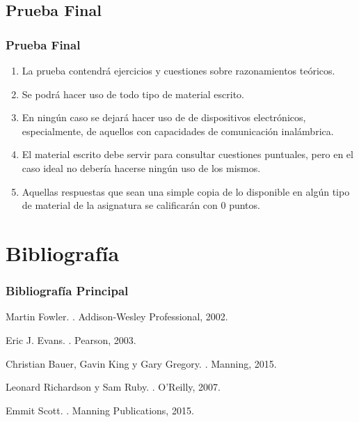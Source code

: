 \documentclass[handout,a4paper,t,xcolor=pst,colortheme]{beamer}
\begin{document}
\subsection{Prueba Final}

\begin{frame}[c]
    \frametitle{Prueba Final}
	\begin{enumerate}[<+->]
		\item La prueba contendrá ejercicios y cuestiones sobre razonamientos teóricos.
        \item Se podrá hacer uso de todo tipo de material escrito.
        \item En ningún caso se dejará hacer uso de de dispositivos electrónicos, especialmente, de aquellos con capacidades de comunicación inalámbrica.
		\item \alert{El material escrito debe servir para consultar cuestiones puntuales, pero en el caso ideal no debería hacerse ningún uso de los mismos}.
		\item Aquellas respuestas que sean una simple copia de lo disponible en algún tipo de material de la asignatura se calificarán con 0 puntos.
	\end{enumerate}
\end{frame}

\section{Bibliografía}

\begin{frame}[c]
	\frametitle{Bibliografía Principal}
    \begin{thebibliography}{1}

Martin Fowler.
.
\newblock Addison-Wesley Professional, 2002.

Eric J. Evans.
.
\newblock Pearson, 2003.

Christian Bauer, Gavin King y Gary Gregory.
.
\newblock  Manning, 2015.

Leonard Richardson y Sam Ruby.
.
\newblock  O'Reilly, 2007.

\bibitem{}
Emmit Scott.
.
\newblock  Manning Publications, 2015.

\end{thebibliography}
\end{frame}
\end{document}
